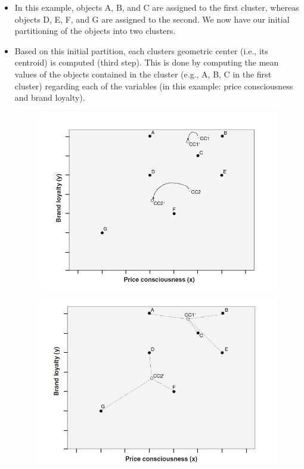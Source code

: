 \documentclass[a4paper,12pt]{article}
\begin{document}
\begin{itemize}
\item In this example, objects A, B, and C are
assigned to the first cluster, whereas objects D, E, F, and G are assigned to the
second. We now have our initial partitioning of the objects into two clusters.
\item Based on this initial partition, each clusters geometric center (i.e., its centroid)
is computed (third step). This is done by computing the mean values of the objects
contained in the cluster (e.g., A, B, C in the first cluster) regarding each of the variables
(in this example: price consciousness and brand loyalty).
\begin{figure}[h!]
	\begin{center}
		\includegraphics[scale=0.4]{images/kmeans3.jpg}\\
	\end{center}
\end{figure}
\begin{figure}[h!]
	\begin{center}
		\includegraphics[scale=0.4]{images/kmeans4.jpg}\\

\end{center}
\end{figure}
\end{itemize}
\end{document}
